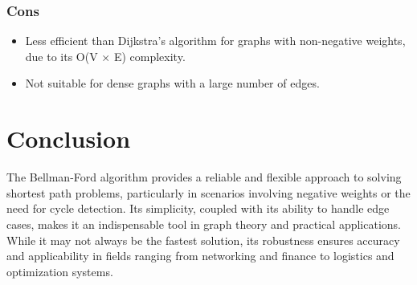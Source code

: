 \documentclass[12pt]{article}
\begin{document}
\subsubsection{Cons}
\begin{itemize}
	\item Less efficient than Dijkstra's algorithm for graphs with non-negative weights, due to its O(V × E) complexity. 
	\item Not suitable for dense graphs with a large number of edges.
\end{itemize}

\section{Conclusion}
The Bellman-Ford algorithm provides a reliable and flexible approach to solving shortest path problems, particularly in scenarios involving negative weights or the need for cycle detection. Its simplicity, coupled with its ability to handle edge cases, makes it an indispensable tool in graph theory and practical applications. While it may not always be the fastest solution, its robustness ensures accuracy and applicability in fields ranging from networking and finance to logistics and optimization systems. \par
\end{document}
